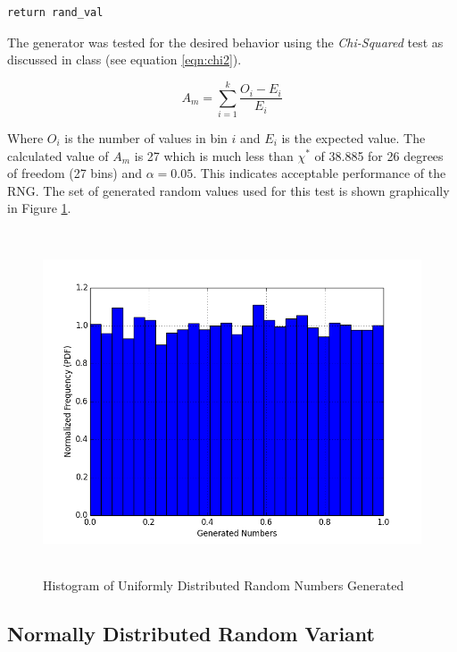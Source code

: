 \documentclass[paper=a4, fontsize=11pt]{scrartcl}
\numberwithin{equation}{section}		%
\numberwithin{figure}{section}			%
\numberwithin{table}{section}		    %
\begin{document}
\begin{appendices}
\begin{lstlisting}[frame=single, label=some-code, caption=Minimal Random Number Generator]
    return rand_val
\end{lstlisting}
\vspace{2mm}

\newpage
\noindent
The generator was tested for the desired behavior using the \emph{Chi-Squared} test 
\cite{Navidi2008Stats} as discussed in class (see equation \ref{eqn:chi2}). 

\begin{equation} \label{eqn:chi2}
A_m = \sum_{i=1}^{k} \frac{O_i - E_i}{E_i}
\end{equation} 

\noindent
Where $O_i$ is the number of values in bin $i$ and $E_i$ is the expected value.
The calculated value of $A_m$ is 27 which is much less than $\chi^*$ of 38.885 for 26 degrees of 
freedom (27 bins) and $\alpha = 0.05$. This indicates acceptable performance of the RNG. The set of 
generated random values used for this test is shown graphically in Figure \ref{fig:A:URNG}.\\

\begin{figure}[H]
	\begin{center} 
		\includegraphics[height=4in,width=5.5in]{uniform_rng} 
		\caption{Histogram of Uniformly Distributed Random Numbers Generated\label{fig:A:URNG}}
	\end{center} 
\end{figure}

\newpage
\subsection{Normally Distributed Random Variant} \label{sec:A:rng:normalmrng}


\end{appendices}
\end{document}
